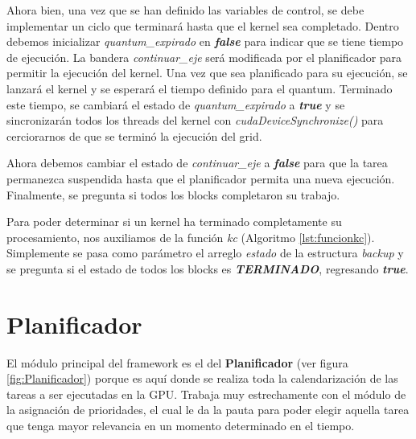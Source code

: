 Ahora bien, una vez que se han definido las variables de control, se debe implementar un ciclo que terminará hasta que el kernel sea completado. Dentro debemos inicializar \textit{quantum\_expirado} en \textbf{\textit{false}} para indicar que se tiene tiempo de ejecución. La bandera \textit{continuar\_eje} será modificada por el planificador para permitir la ejecución del kernel. Una vez que sea planificado para su ejecución, se lanzará el kernel  y se esperará el tiempo definido para el quantum. Terminado este tiempo, se cambiará el estado de \textit{quantum\_expirado} a \textit{\textbf{true}} y se sincronizarán todos los threads del kernel con \textit{cudaDeviceSynchronize()} para cerciorarnos de que se terminó la ejecución del grid.

Ahora debemos cambiar el estado de \textit{continuar\_eje} a \textbf{\textit{false}} para que la tarea permanezca suspendida hasta que el planificador permita una nueva ejecución. Finalmente, se pregunta si todos los blocks completaron su trabajo.



Para poder determinar si un kernel ha terminado completamente su procesamiento, nos auxiliamos de la función \textit{kc} (Algoritmo \ref{lst:funcionkc}). Simplemente se pasa como parámetro el arreglo \textit{estado} de la estructura \textit{backup} y se pregunta si el estado de todos los blocks es \textit{\textbf{TERMINADO}}, regresando \textbf{\textit{true}}.



\section{Planificador} \label{secc:planificador}

El módulo principal del framework es el del \textbf{Planificador} (ver figura \ref{fig:Planificador}) porque es aquí donde se realiza toda la calendarización de las tareas a ser ejecutadas en la GPU. Trabaja muy estrechamente con el módulo de la asignación de prioridades, el cual le da la pauta para poder elegir aquella tarea que tenga mayor relevancia en un momento determinado en el tiempo. 

